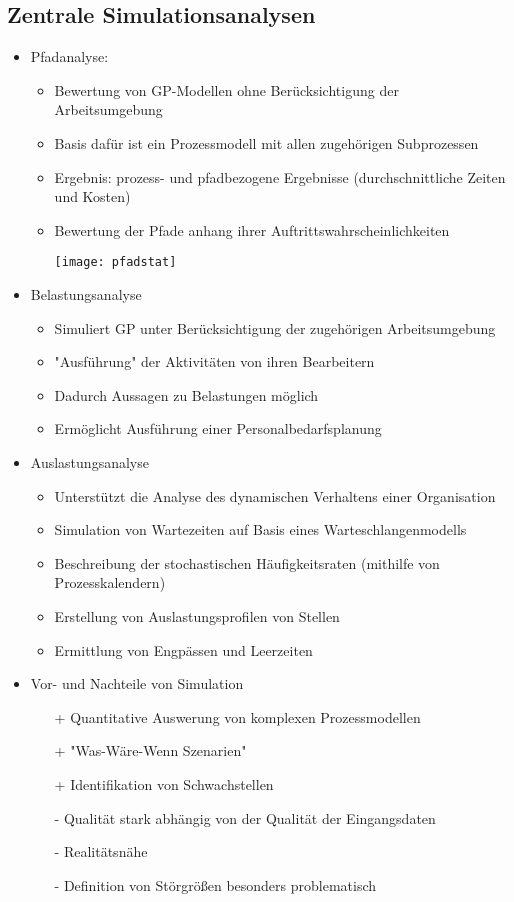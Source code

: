 \subsection{Zentrale Simulationsanalysen}
\begin{itemize}
\item Pfadanalyse:
	\begin{itemize}
	\item Bewertung von GP-Modellen ohne Berücksichtigung der Arbeitsumgebung
	\item Basis dafür ist ein Prozessmodell mit allen zugehörigen Subprozessen
	\item Ergebnis: prozess- und pfadbezogene Ergebnisse (durchschnittliche Zeiten und Kosten)
	\item Bewertung der Pfade anhang ihrer Auftrittswahrscheinlichkeiten
	\item[] \texttt{[image: pfadstat]}
	\end{itemize}

\item Belastungsanalyse
	\begin{itemize}
	\item Simuliert GP unter Berücksichtigung der zugehörigen Arbeitsumgebung
	\item "Ausführung" der Aktivitäten von ihren Bearbeitern
	\item Dadurch Aussagen zu Belastungen möglich
	\item Ermöglicht Ausführung einer Personalbedarfsplanung
	\end{itemize}

\item Auslastungsanalyse
	\begin{itemize}
	\item Unterstützt die Analyse des dynamischen Verhaltens einer Organisation
	\item Simulation von Wartezeiten auf Basis eines Warteschlangenmodells
	\item Beschreibung der stochastischen Häufigkeitsraten (mithilfe von Prozesskalendern)
	\item Erstellung von Auslastungsprofilen von Stellen
	\item Ermittlung von Engpässen und Leerzeiten
	\end{itemize}

\item Vor- und Nachteile von Simulation
	\begin{itemize}
	\item[+] Quantitative Auswerung von komplexen Prozessmodellen
	\item[+] "Was-Wäre-Wenn Szenarien"
	\item[+] Identifikation von Schwachstellen
	\item[-] Qualität stark abhängig von der Qualität der Eingangsdaten
	\item[-] Realitätsnähe
	\item[-] Definition von Störgrößen besonders problematisch	
	
	\end{itemize}

\end{itemize}
\pagebreak

